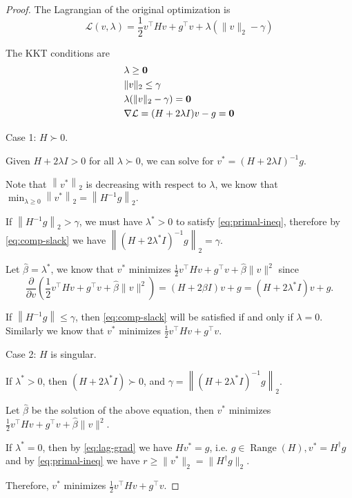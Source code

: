 \documentclass[11pt]{article}
\newcommand{\grad}{\nabla}
\newcommand{\half}{\frac{1}{2}} %
\newcommand{\inv}{^{-1}}        %
\newcommand{\T}{^\top}          %
\begin{document}
\begin{proof}
    The Lagrangian of the original optimization is
    \[
        \mathcal{L}(v, \lambda) = \half v\T H v + g\T v + \lambda (\|v\|_2 - \gamma)
    \]

    The KKT conditions are
    \begin{align}
        & \lambda \geq \zeros\label{eq:dual-ineq}\\
        & \|v\|_2 \leq \gamma\label{eq:primal-ineq}\\
        & \lambda (\|v\|_2 - \gamma) = \zeros\label{eq:comp-slack}\\
        & \grad \mathcal{L} = (H + 2\lambda I) v - g = \zeros\label{eq:lag-grad}
    \end{align}

    Case 1: $H \succ 0$.
    
    Given $H+2 \lambda I>0$ for all $\lambda \succ 0$, we can solve for $v^* = (H + 2\lambda I)\inv g$.

    Note that $\left\|v^*\right\|_2$ is decreasing with respect to $\lambda$, we know that $\min _{\lambda \geq 0}\left\|v^*\right\|_2=\left\|H^{-1} g\right\|_2$.
    
    If $\left\|H^{-1} g\right\|_2 > \gamma$, we must have $\lambda^*>0$ to satisfy \eqref{eq:primal-ineq}, therefore by \eqref{eq:comp-slack} we have $\left\|\left(H+2 \lambda^* I\right)^{-1} g\right\|_2=\gamma$. 
    
    Let $\hat{\beta}=\lambda^*$, we know that $v^*$ minimizes $\frac{1}{2} v^{\top} H v+g^{\top} v+\hat{\beta}\|v\|^2$ since
    $$
    \frac{\partial}{\partial v}\left(\frac{1}{2} v^{\top} H v+g^{\top} v+\hat{\beta}\|v\|^2\right)=(H+2 \beta I) v+g=\left(H+2 \lambda^* I\right) v+g .
    $$


    If $\left\|H^{-1} g\right\| \leqslant \gamma$, then \eqref{eq:comp-slack} will be satisfied if and only if $\lambda=0$. Similarly we know that $v^*$ minimizes $\frac{1}{2} v^{\top} H v+g^{\top} v$.

    Case 2: $H$ is singular.

    If $\lambda^*>0$, then $\left(H+2 \lambda^* I\right) \succ 0$, and $\gamma=\left\|\left(H+2 \lambda^* I\right)^{-1} g\right\|_2$.

    Let $\hat{\beta}$ be the solution of the above equation, then $v^*$ minimizes $\frac{1}{2} v^{\top} H v+g^{\top} v+\hat{\beta}\|v\|^2$.

    If $\lambda^*=0$, then by \eqref{eq:lag-grad} we have $H v^*=g$, i.e. $g \in \operatorname{Range}(H), v^*=H^{\dagger} g$ and by \eqref{eq:primal-ineq} we have $r \geq \| v^*\|_2=\| H^{\dagger} g \|_2$.

    Therefore, $v^*$ minimizes $\frac{1}{2} v^{\top} H v+g^{\top} v$.


\end{proof}
\end{document}
